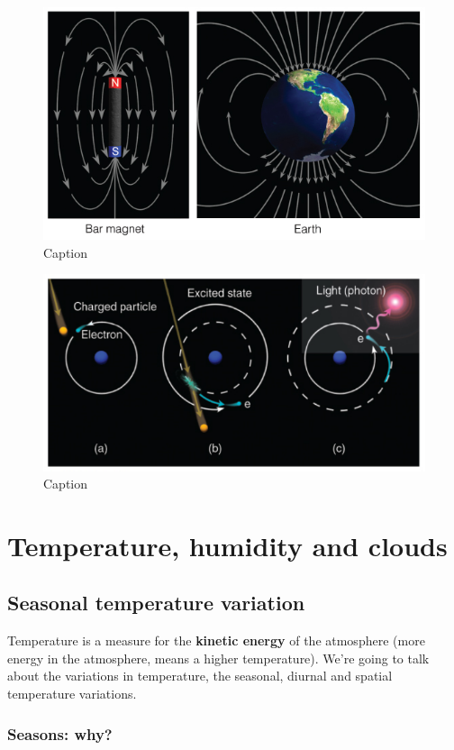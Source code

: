 \documentclass[oneside]{book}
\begin{document}
\begin{figure}

{\centering \includegraphics[width=0.5\linewidth]{figures/Figure145} 

}

\caption{Caption}\label{fig:borealis2}
\end{figure}

\begin{figure}

{\centering \includegraphics[width=0.5\linewidth]{figures/Figure146} 

}

\caption{Caption}\label{fig:borealis3}
\end{figure}

\chapter{Temperature, humidity and
clouds}\label{temperature-humidity-and-clouds}


\section{Seasonal temperature
variation}\label{seasonal-temperature-variation}

Temperature is a measure for the \textbf{kinetic energy} of the
atmosphere (more energy in the atmosphere, means a higher temperature).
We're going to talk about the variations in temperature, the seasonal,
diurnal and spatial temperature variations.

\subsection{Seasons: why?}\label{seasons-why}
\end{document}
